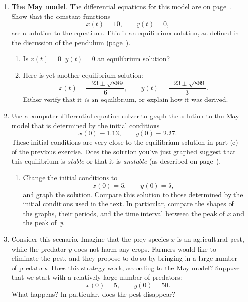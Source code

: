 \begin{enumerate}
\item {\bf The May model}. The differential equations
for this model are on page~\pageref{May}.  Show that the constant
functions
	\[
x(t) = 10, \qquad y(t) = 0,
\]
are a solution to the equations.  This is an equilibrium solution, as
defined in the discussion of the pendulum
(page~\pageref{equilibrium}).

  \begin{enumerate}
  \item Is $x(t) = 0$, $y(t) = 0$ an equilibrium solution?

  \item Here is yet another equilibrium solution:
	\[
x(t) = \dfrac{-23 \pm \sqrt{889}}{6}, \qquad 
		y(t) = \dfrac{-23 \pm \sqrt{889}}{3}.
\]
Either verify that it {\em is\/} an equilibrium, or explain how it was
derived.


\end{enumerate}
\item Use a computer differential equation solver to graph the
solution to the May model that is determined by the initial conditions
	\[
x(0) = 1.13, \qquad y(0) = 2.27.
\]
These initial conditions are very close to the equilibrium solution in
part (c) of the previous exercise.  Does the solution you've just
graphed suggest that this equilibrium is {\em stable\/} or that it is
{\em unstable\/} (as described on page~\pageref{equilibrium}).

  \begin{enumerate}
  \item Change the initial conditions to
	\[
x(0) = 5, \qquad y(0) = 5,
\]
and graph the solution.  Compare this solution to those determined by
the initial conditions used in the text.  In particular, compare the
shapes of the graphs, their periods, and the time interval between the
peak of $x$ and the peak of~$y$.


\end{enumerate}
\item Consider this scenario.  Imagine that the prey species $x$ is an
agricultural pest, while the predator $y$ does not harm any crops.
Farmers would like to eliminate the pest, and they propose to do so by
bringing in a large number of predators.  Does this strategy work,
according to the May model?  Suppose that we start with a relatively
large number of predators:
	\[
x(0) = 5, \qquad y(0) = 50.
\]
What happens?  In particular, does the pest disappear?



\end{enumerate}
